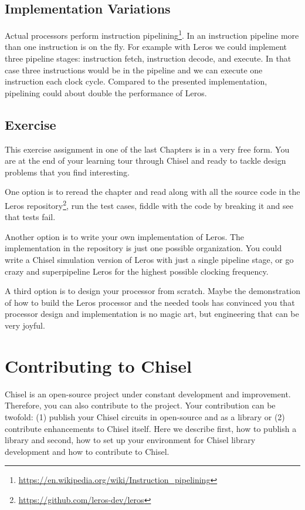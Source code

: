 \documentclass[%
    10pt,
    headinclude, footexclude,
    openright, %
    notitlepage,
    cleardoubleempty,
    headsepline,
    pointlessnumbers,
    bibtotoc, idxtotoc,
    ]{scrbook}
\newcommand{\myref}[2]{\href{#1}{#2}}
\renewcommand{\myref}[2]{{#2}{\footnote{\url{#1}}}}
\begin{document}
\section{Implementation Variations}

Actual processors perform
\myref{https://en.wikipedia.org/wiki/Instruction_pipelining}{instruction pipelining}.
In an instruction pipeline more than one instruction is on the fly. For example
with Leros we could implement three pipeline stages: instruction fetch,
instruction decode, and execute. In that case three instructions would
be in the pipeline and we can execute one instruction each clock cycle.
Compared to the presented implementation, pipelining could about double
the performance of Leros.


\section{Exercise}

This exercise assignment in one of the last Chapters is in a very free form. You are at the end
of your learning tour through Chisel and ready to tackle design problems that
you find interesting.

One option is to reread the chapter and read along with all the source code in the
\myref{https://github.com/leros-dev/leros}{Leros repository}, run the test cases,
fiddle with the code by breaking it and see that tests fail.

Another option is to write your own implementation of Leros.
The implementation in the repository is just one possible organization.
You could write a Chisel simulation version of Leros with just a single pipeline stage,
or go crazy and superpipeline Leros for the highest possible clocking frequency.

A third option is to design your processor from scratch. Maybe the demonstration of
how to build the Leros processor and the needed tools has convinced you that processor
design and implementation is no magic art, but engineering that can be very joyful.

\chapter{Contributing to Chisel}


Chisel is an open-source project under constant development and improvement.
Therefore, you can also contribute to the project. Your contribution can be twofold:
(1) publish your Chisel circuits in open-source and as a library or (2) contribute
enhancements to Chisel itself.
Here we describe first, how to publish a library and second, how to
set up your environment for Chisel library development and how to contribute
to Chisel.
\end{document}
